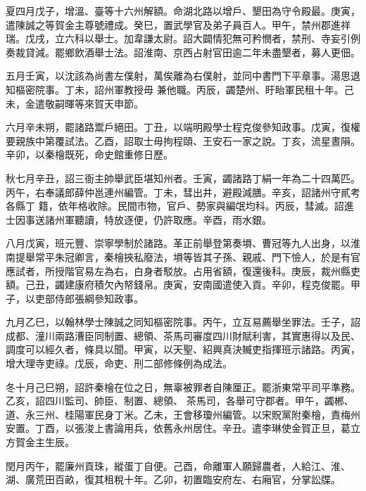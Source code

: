 \begin{pinyinscope}
 夏四月戊子，增溫、臺等十六州解額。命湖北路以增戶、墾田為守令殿最。庚寅，遣陳誠之等賀金主尊號禮成。癸巳，置武學官及弟子員百人。甲午，禁州郡進祥瑞。戊戌，立六科以舉士。加韋謙太尉。詔大闢情犯無可矜憫者，禁刑、寺妄引例奏裁貸減。罷鄉飲酒舉士法。詔淮南、京西占射官田逾二年未盡墾者，募人更佃。



 五月壬寅，以沈該為尚書左僕射，萬俟離為右僕射，並同中書門下平章事。湯思退知樞密院事。丁未，詔州軍教授毋
 兼他職。丙辰，蠲楚州、盱眙軍民租十年。己未，金遣敬嗣暉等來賀天申節。



 六月辛未朔，罷諸路鬻戶絕田。丁丑，以端明殿學士程克俊參知政事。戊寅，復權要親族中第覆試法。乙酉，詔取士毋拘程頤、王安石一家之說。丁亥，流星晝隕。辛卯，以秦檜既死，命史館重修日歷。



 秋七月辛丑，詔三衙主帥舉武臣堪知州者。壬寅，蠲諸路丁絹一年為二十四萬匹。丙午，右奉議郎薛仲邕連州編管。丁未，彗出井，避殿減膳。辛亥，詔諸州守貳考各縣丁
 籍，依年格收除。民間市物，官戶、勢家與編氓均科。丙辰，彗滅。詔進士因事送諸州軍聽讀，特放逐便，仍許取應。辛酉，雨水銀。



 八月戊寅，班元豐、崇寧學制於諸路。革正前舉登第奏塤、曹冠等九人出身，以淮南提舉常平朱冠卿言，秦檜挾私廢法，塤等皆其子孫、親戚、門下憸人，於是有官應試者，所授階官易左為右，白身者駁放。占用省額，復還後科。庚辰，裁州縣吏額。己丑，蠲建康府積欠內帑錢帛。庚寅，安南國遣使入貢。辛卯，程克俊罷。甲
 子，以吏部侍郎張綱參知政事。



 九月乙巳，以翰林學士陳誠之同知樞密院事。丙午，立互易薦舉坐罪法。壬子，詔成都、潼川兩路漕臣同制置、總領、茶馬司審度四川財賦利害，其實惠得以及民、調度可以經久者，條具以聞。甲寅，以天聖、紹興真決贓吏指揮班示諸路。丙寅，增大理寺吏祿。戊辰，命吏、刑二部修條例為成法。



 冬十月己巳朔，詔許秦檜在位之日，無辜被罪者自陳厘正。罷浙東常平司平準務。乙亥，詔四川監司、帥臣、制置、總領、
 茶馬司，各舉可守郡者。甲午，蠲郴、道、永三州、桂陽軍民身丁米。乙未，王會移瓊州編管。以宋貺黨附秦檜，責梅州安置。丁酉，以張浚上書論用兵，依舊永州居住。辛丑。遣李琳使金賀正旦，葛立方賀金主生辰。



 閏月丙午，罷廉州貢珠，縱蛋丁自便。己酉，命離軍人願歸農者，人給江、淮、湖、廣荒田百畝，復其租稅十年。乙卯，初置臨安府左、右廂官，分掌訟牒。




\end{pinyinscope}
